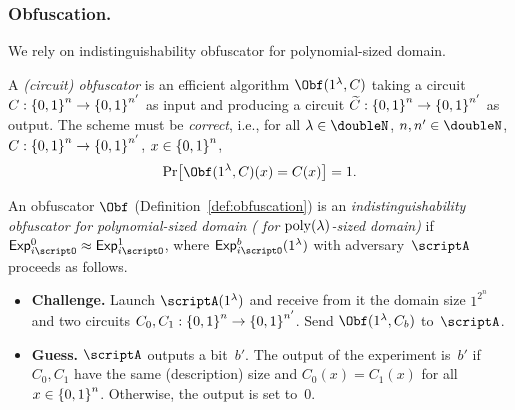 \subsubsection{Obfuscation.}
We rely on indistinguishability obfuscator for polynomial-sized domain.

\begin{definition}\label{def:obfuscation}
A \emph{(circuit) obfuscator} is an efficient algorithm
$\Obf(1^\lambda,C)$
taking a circuit ${C:{\{0,1\}}^n\to{\{0,1\}}^{n'}}$ as input
and producing a circuit ${\widetilde{C}:{\{0,1\}}^n\to{\{0,1\}}^{n'}}$ as output.
The scheme must be \emph{correct}, i.e., for all
${\lambda\in\doubleN}$,
${n,n'\in\doubleN}$,
${C:{\{0,1\}}^n\to{\{0,1\}}^{n'}}$,
${x\in{\{0,1\}}^n}$,
\begin{align*}
\Pr\bigl[
\Obf(1^\lambda,C)(x)=C(x)
\bigr]=1.
\end{align*}
\end{definition}

\begin{definition}
\label{def:obfuscation-security}
An obfuscator $\Obf$ (Definition~\ref{def:obfuscation}) is
an \emph{indistinguishability obfuscator for polynomial-sized domain
({\iO} for $\operatorname{poly}(\lambda)$-sized domain)}
if ${\ExpIO{0}\approx\ExpIO{1}}$,
where $\ExpIO{b}(1^\lambda)$ with adversary~$\scriptA$ proceeds as follows.
\begin{itemize}\upshape
\item\textbf{Challenge.}
Launch $\scriptA(1^\lambda)$ and receive from it
the domain size $1^{2^n}$ and two circuits ${C_0,C_1:{\{0,1\}}^n\to{\{0,1\}}^{n'}}$.
Send $\Obf(1^\lambda,C_b)$ to~$\scriptA$.
\item\textbf{Guess.}
$\scriptA$ outputs a bit~$b'$.
The output of the experiment is~$b'$ if $C_0,C_1$ have the same (description) size and ${C_0(x)=C_1(x)}$ for all~${x\in{\{0,1\}}^n}$.
Otherwise, the output is set to~$0$.
\end{itemize}
\end{definition}
